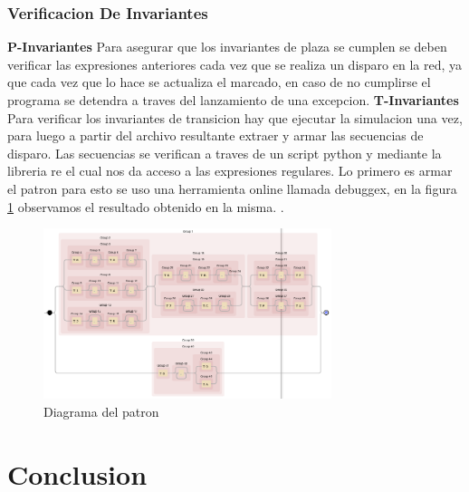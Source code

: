 \documentclass{article}
\begin{document}
		\subsubsection{Verificacion De Invariantes}
		\textbf{P-Invariantes} \newline
		Para asegurar que los invariantes de plaza se cumplen se deben verificar las 
		expresiones anteriores cada vez que se realiza un disparo en la red, ya que 
		cada vez que lo hace se actualiza el marcado, en caso de no cumplirse el programa
		se detendra a traves del lanzamiento de una excepcion.\newline
		\textbf{T-Invariantes} \newline
		Para verificar los invariantes de transicion hay que ejecutar la simulacion una vez, 
		para luego a partir del archivo resultante extraer y armar las secuencias de disparo.
		Las secuencias se verifican a traves de un script python y mediante la libreria re el cual nos da acceso a las expresiones regulares. Lo primero es armar el patron para esto se uso una herramienta online llamada debuggex, en la figura \ref{fig:mesh4} observamos el resultado obtenido en la misma.
		.		 
		\begin{figure}[H]
			\centering
			\includegraphics[width=0.75\textwidth]{debuggex}
			\caption{Diagrama del patron}
			\label{fig:mesh4}
		\end{figure}

\section{Conclusion}
\end{document}
